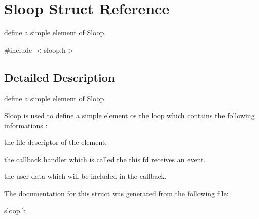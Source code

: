 \hypertarget{structSloop}{\section{\-Sloop \-Struct \-Reference}
\label{structSloop}
}


define a simple element of \hyperlink{structSloop}{\-Sloop}.  




{\ttfamily \#include $<$sloop.\-h$>$}



\subsection{\-Detailed \-Description}
define a simple element of \hyperlink{structSloop}{\-Sloop}. 

\hyperlink{structSloop}{\-Sloop} is used to define a simple element os the loop which contains the following informations \-:
\begin{DoxyItemize}
\item the file descriptor of the element.
\item the callback handler which is called the this fd receives an event.
\item the user data which will be included in the callback.
\item 
\end{DoxyItemize}

\-The documentation for this struct was generated from the following file\-:\begin{DoxyCompactItemize}
\item 
\hyperlink{sloop_8h}{sloop.\-h}\end{DoxyCompactItemize}
